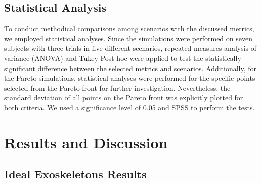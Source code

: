 \documentclass[10pt,letterpaper]{article}
\begin{document}
\subsection*{Statistical Analysis}
To conduct methodical comparisons among scenarios with the discussed metrics, we employed statistical analyses. Since the simulations were performed on seven subjects with three trials in five different scenarios, repeated measures analysis of variance (ANOVA) and Tukey Post-hoc were applied to test the statistically significant difference between the selected metrics and scenarios.  Additionally, for the Pareto simulations, statistical analyses were performed for the specific points selected from the Pareto front for further investigation. Nevertheless, the standard deviation of all points on the Pareto front was explicitly plotted for both criteria. We used a significance level of 0.05 and SPSS \cite{spss} to perform the tests. 
\section*{Results and Discussion}
\subsection*{Ideal Exoskeletons Results}
\end{document}

